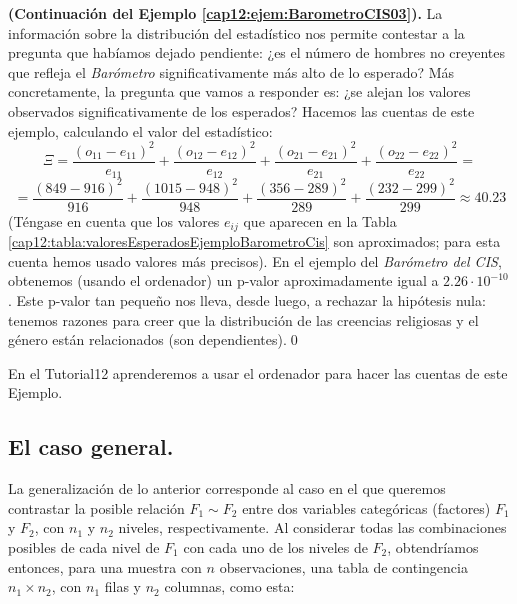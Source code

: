 \begin{ejemplo}{\bf (Continuación del Ejemplo \ref{cap12:ejem:BarometroCIS03}).}
\label{cap12:ejem:BarometroCIS04}
La información sobre la distribución del estadístico nos permite contestar a la pregunta que
habíamos dejado pendiente:  ¿es el número de hombres no creyentes que refleja el {\em Barómetro}
significativamente más alto de lo esperado? Más concretamente, la pregunta que vamos a responder
es: ¿se alejan los valores observados significativamente de los esperados? Hacemos las cuentas de
este ejemplo, calculando el valor del estadístico:
        \[
        \Xi=\dfrac{(o_{11}-e_{11})^2}{e_{11}}+\dfrac{(o_{12}-e_{12})^2}{e_{12}}+\dfrac{(o_{21}-e_{21})^2}{e_{21}}+\dfrac{(o_{22}-e_{22})^2}{e_{22}}=
        \]
        \[
        =\dfrac{(849-916)^2}{916}+\dfrac{(1015-948)^2}{948}+\dfrac{(356-289)^2}{289}+\dfrac{(232-299)^2}{299}
            \approx 40.23
        \]
(Téngase en cuenta que los valores $e_{ij}$ que aparecen en la Tabla
\ref{cap12:tabla:valoresEsperadosEjemploBarometroCis} son aproximados; para esta cuenta hemos usado
valores más precisos).  En el ejemplo del {\em Barómetro del CIS}, obtenemos (usando el ordenador) un p-valor
aproximadamente igual a $2.26\cdot 10^{-10}$. Este p-valor tan pequeño nos lleva, desde luego, a
rechazar la hipótesis nula: tenemos razones para creer que la distribución de las creencias
religiosas y el género están relacionados (son dependientes).\qed
\end{ejemplo}
En el Tutorial12 aprenderemos a usar el ordenador para hacer las cuentas de este Ejemplo.

\subsection{El caso general.}
\label{cap12:subsec:CasoGeneralTablasContingencia}

La generalización de lo anterior corresponde al caso en el que queremos contrastar la posible
relación $F_1 \sim F_2$ entre dos variables categóricas (factores) $F_1$ y $F_2$, con $n_1$ y $n_2$
niveles, respectivamente. Al considerar todas las combinaciones posibles de cada nivel de $F_1$ con
cada uno de los niveles de $F_2$, obtendríamos entonces, para una muestra con $n$ observaciones,
una tabla de contingencia $n_1\times n_2$, con $n_1$ filas y $n_2$ columnas, como esta:

